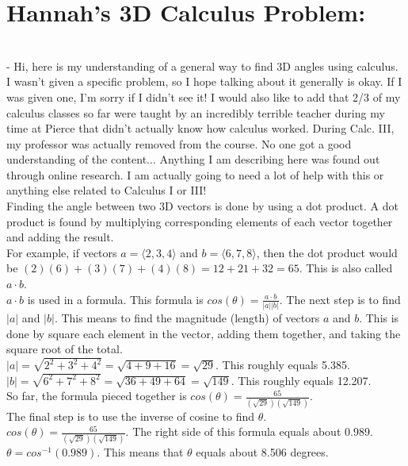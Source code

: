 \documentclass{article}
\begin{document}
\section*{Hannah's 3D Calculus Problem:}\\
- Hi, here is my understanding of a general way to find 3D angles using calculus. I wasn't given a specific problem, so I hope talking about it generally is okay. If I was given one, I'm sorry if I didn't see it! I would also like to add that 2/3 of my calculus classes so far were taught by an incredibly terrible teacher during my time at Pierce that didn't actually know how calculus worked. During Calc. III, my professor was actually removed from the course. No one got a good understanding of the content... Anything I am describing here was found out through online research. I am actually going to need a lot of help with this or anything else related to Calculus I or III!\\

Finding the angle between two 3D vectors is done by using a dot product. A dot product is found by multiplying corresponding elements of each vector together and adding the result.\\
For example, if vectors $a=\langle 2, 3, 4 \rangle$ and $b=\langle 6, 7, 8 \rangle$, then the dot product would be $(2)(6)+(3)(7)+(4)(8)=12+21+32=65$. This is also called $a \cdot b$.\\
$a \cdot b$ is used in a formula. This formula is $cos(\theta)=\frac{a \cdot b}{|a||b|}$. The next step is to find $|a|$ and $|b|$. This means to find the magnitude (length) of vectors $a$ and $b$. This is done by square each element in the vector, adding them together, and taking the square root of the total.\\
$|a|=\sqrt{2^2+3^2+4^2}=\sqrt{4+9+16}=\sqrt{29}$. This roughly equals 5.385.\\
$|b|=\sqrt{6^2+7^2+8^2}=\sqrt{36+49+64}=\sqrt{149}$. This roughly equals 12.207.\\
So far, the formula pieced together is $cos(\theta)=\frac{65}{(\sqrt{29})(\sqrt{149})}$.\\
The final step is to use the inverse of cosine to find $\theta$.\\
$cos(\theta)=\frac{65}{(\sqrt{29})(\sqrt{149})}$. The right side of this formula equals about 0.989.\\
$\theta = cos^{-1}(0.989)$. This means that $\theta$ equals about 8.506 degrees.\\
\end{document}
